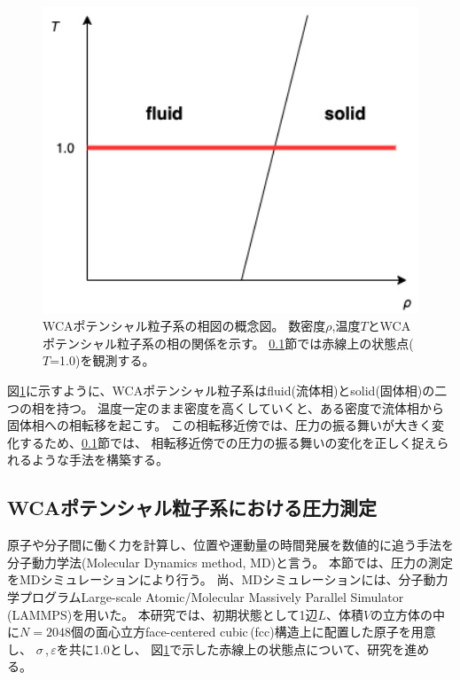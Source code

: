 \documentclass[titlepage]{jsreport}
\begin{document}
{{{\begin{figure}[htbp]
    \begin{center}
        \includegraphics[width=12cm]{fig/wca-phase-diagram.png}
    \end{center}
    \caption{WCAポテンシャル粒子系の相図の概念図。
    数密度$\rho$,温度$T$とWCAポテンシャル粒子系の相の関係を示す。
    \ref{method-subsec:WCA-pressure}節では赤線上の状態点($T$=1.0)を観測する。}
    
    \label{fig:wca-phase-diagram}
\end{figure}

\newpage
図\ref{fig:wca-phase-diagram}に示すように、WCAポテンシャル粒子系はfluid(流体相)とsolid(固体相)の二つの相を持つ。
温度一定のまま密度を高くしていくと、ある密度で流体相から固体相への相転移を起こす。
この相転移近傍では、圧力の振る舞いが大きく変化するため、\ref{method-subsec:WCA-pressure}節では、
相転移近傍での圧力の振る舞いの変化を正しく捉えられるような手法を構築する。


\subsection{WCAポテンシャル粒子系における圧力測定}\label{method-subsec:WCA-pressure}
原子や分子間に働く力を計算し、位置や運動量の時間発展を数値的に追う手法を分子動力学法(Molecular Dynamics method, MD)と言う\cite{molecular-dynamics}。
本節では、圧力の測定をMDシミュレーションにより行う。
尚、MDシミュレーションには、分子動力学プログラムLarge-scale Atomic/Molecular Massively Parallel Simulator\,(LAMMPS)\cite{lammps}を用いた。
本研究では、初期状態として1辺$L$、体積$V$の立方体の中に$N=2048$個の面心立方face-centered cubic\,(fcc)構造上に配置した原子を用意し、
${\sigma}$\,,\,${\varepsilon}$を共に1.0とし、
図\ref{fig:wca-phase-diagram}で示した赤線上の状態点について、研究を進める。

}}}
\end{document}
